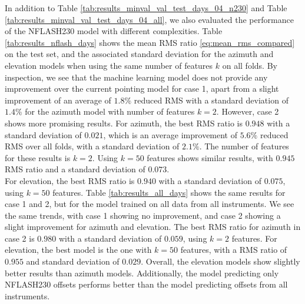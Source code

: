 In addition to Table \ref{tab:results_minval_val_test_days_04_n230} and Table \ref{tab:results_minval_val_test_days_04_all},
we also evaluated the performance of the NFLASH230 model with different complexities.
Table \ref{tab:results_nflash_days} shows the mean RMS ratio \eqref{eq:mean_rms_compared} on the test set,
and the associated standard deviation for the azimuth and elevation models when using the same number of features $k$ on all folds.
By inspection, we see that the machine learning model does not provide any improvement over the current pointing model for case 1, apart from a slight improvement of an average of $1.8\%$ reduced RMS with a standard deviation of $1.4\%$ for the azimuth model with number of features $k=2$.
However, case 2 shows more promising results.
For azimuth, the best RMS ratio is $0.948$ with a standard deviation of $0.021$, which is an average improvement of $5.6\%$ reduced RMS over all folds, with a standard deviation of $2.1\%$.
The number of features for these results is $k=2$.
Using $k=50$ features shows similar results, with $0.945$ RMS ratio and a standard deviation of $0.073$.\\

For elevation, the best RMS ratio is $0.940$ with a standard deviation of $0.075$, using $k=50$ features.
Table \ref{tab:results_all_days} shows the same results for case 1 and 2, but for the model trained on all data from all instruments.
We see the same trends, with case 1 showing no improvement, and case 2 showing a slight improvement for azimuth and elevation.
The best RMS ratio for azimuth in case 2 is $0.980$ with a standard deviation of $0.059$, using $k=2$ features.
For elevation, the best model is the one with $k=50$ features, with a RMS ratio of $0.955$ and standard deviation of $0.029$.
Overall, the elevation models show slightly better results than azimuth models.
Additionally, the model predicting only NFLASH230 offsets performs better than the model predicting offsets from all instruments. \\


